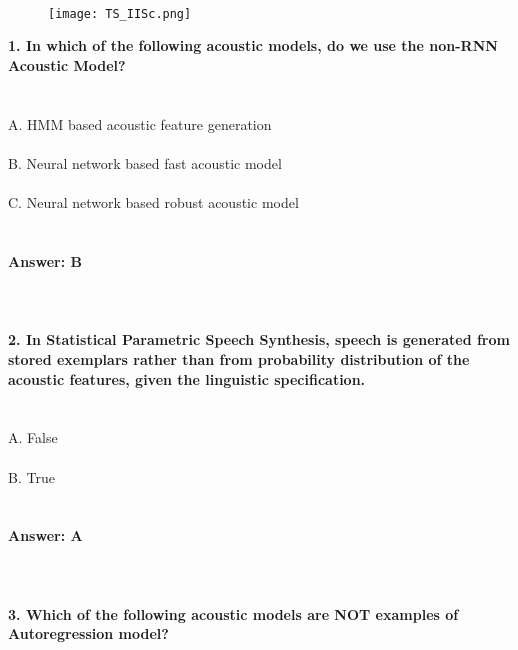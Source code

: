 \documentclass[prl,twocolumn,showpacs,preprintnumbers,superscriptaddress]{revtex4}
\theoremstyle{plain}
\theoremstyle{definition}
\begin{document}
\begin{widetext}
\\
\\
\\

\begin{wrapfigure}
\centering
\end{wrapfigure}
\begin{figure}[h!]
 \begin{right}
  \hfill\texttt{[image: TS\_IISc.png]}
 \end{right}
\end{figure}
\noindent\textbf{1. In which of the following acoustic models, do we use the non-RNN Acoustic Model?}
\\
\\
\\
A. HMM based acoustic feature generation
\\
\\
B. Neural network based fast acoustic model
\\
\\
C. Neural network based robust acoustic model
\\
\\
\\
\textbf{Answer: B}
\\
\\
\\
\\
\textbf{2. In Statistical Parametric Speech Synthesis, speech is generated from stored exemplars rather than from probability distribution of the acoustic features, given the linguistic specification.}
\\
\\
\\
\noindent A. False
\\
\\
B. True 
\\
\\
\\
\textbf{Answer: A}
\\
\\
\\
\\
\textbf{3. Which of the following acoustic models are NOT examples of Autoregression model?}
\\
\\

\end{widetext}
\end{document}
